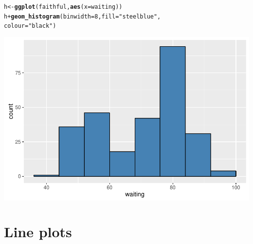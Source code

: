 \documentclass{beamer}\usepackage[]{graphicx}\usepackage[]{color}
\makeatletter
\newcommand{\hlnum}[1]{\textcolor[rgb]{0.686,0.059,0.569}{#1}}%
\newcommand{\hlstr}[1]{\textcolor[rgb]{0.192,0.494,0.8}{#1}}%
\newcommand{\hlopt}[1]{\textcolor[rgb]{0,0,0}{#1}}%
\newcommand{\hlstd}[1]{\textcolor[rgb]{0.345,0.345,0.345}{#1}}%
\newcommand{\hlkwb}[1]{\textcolor[rgb]{0.69,0.353,0.396}{#1}}%
\newcommand{\hlkwc}[1]{\textcolor[rgb]{0.333,0.667,0.333}{#1}}%
\newcommand{\hlkwd}[1]{\textcolor[rgb]{0.737,0.353,0.396}{\textbf{#1}}}%
\newenvironment{kframe}{%
 \def\at@end@of@kframe{}%
 \ifinner\ifhmode%
  \def\at@end@of@kframe{\end{minipage}}%
  \begin{minipage}{\columnwidth}%
 \fi\fi%
 \def\FrameCommand##1{\hskip\@totalleftmargin \hskip-\fboxsep
 \colorbox{shadecolor}{##1}\hskip-\fboxsep
     \hskip-\linewidth \hskip-\@totalleftmargin \hskip\columnwidth}%
 \MakeFramed {\advance\hsize-\width
   \@totalleftmargin\z@ \linewidth\hsize
   \@setminipage}}%
 {\par\unskip\endMakeFramed%
 \at@end@of@kframe}
\newenvironment{knitrout}{}{} %
\makeatother
\begin{document}
\begin{frame}[fragile]
\begin{knitrout}\footnotesize
{}\color{fgcolor}\begin{kframe}
\begin{alltt}
\hlstd{h} \hlkwb{<-} \hlkwd{ggplot}\hlstd{(faithful,} \hlkwd{aes}\hlstd{(}\hlkwc{x} \hlstd{= waiting))}
\hlstd{h} \hlopt{+} \hlkwd{geom_histogram}\hlstd{(}\hlkwc{binwidth} \hlstd{=} \hlnum{8}\hlstd{,} \hlkwc{fill} \hlstd{=} \hlstr{"steelblue"}\hlstd{,}
\hlkwc{colour} \hlstd{=} \hlstr{"black"}\hlstd{)}
\end{alltt}
\end{kframe}

{\centering \includegraphics[width=.75\linewidth]{figure/histogra-1} 

}



\end{knitrout}
\end{frame}


\section*{Line plots}
\frame{\sectionpage}

\end{document}

